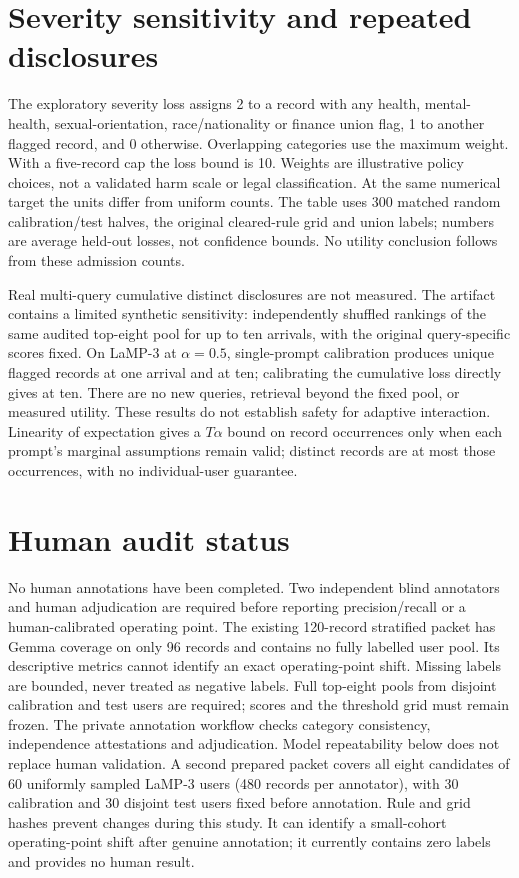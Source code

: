 \documentclass[10pt]{article}
\begin{document}
\section{Severity sensitivity and repeated disclosures}
The exploratory severity loss assigns 2 to a record with any health,
mental-health, sexual-orientation, race/nationality or finance union flag,
1 to another flagged record, and 0 otherwise. Overlapping categories use
the maximum weight. With a five-record cap the loss bound is 10.
Weights are illustrative policy choices, not a validated harm scale or
legal classification. At the same numerical target the units differ from
uniform counts. The table uses 300 matched random calibration/test halves,
the original cleared-rule grid and union labels; numbers are average
held-out losses, not confidence bounds. No utility conclusion follows
from these admission counts.


Real multi-query cumulative distinct disclosures are not measured. The
artifact contains a limited synthetic sensitivity: independently shuffled
rankings of the same audited top-eight pool for up to ten arrivals, with
the original query-specific scores fixed. On LaMP-3 at $\alpha=0.5$,
single-prompt calibration produces \CumulativeSingleOne{} unique flagged records at one
arrival and \CumulativeSingleTen{} at ten; calibrating the cumulative loss directly gives
\CumulativeCalibratedTen{} at ten. There are no new queries, retrieval beyond the fixed pool,
or measured utility. These results do not establish safety for adaptive
interaction. Linearity of expectation gives a $T\alpha$ bound on record
occurrences only when each prompt's marginal assumptions remain valid;
distinct records are at most those occurrences, with no individual-user guarantee.

\section{Human audit status}
No human annotations have been completed. Two independent blind annotators
and human adjudication are required before reporting precision/recall or a
human-calibrated operating point. The existing 120-record stratified packet
has Gemma coverage on only 96 records and contains no fully labelled user
pool. Its descriptive metrics cannot identify an exact operating-point
shift. Missing labels are bounded, never treated as negative labels.
Full top-eight pools from disjoint calibration and test users are required;
scores and the threshold grid must remain frozen. The private annotation
workflow checks category consistency, independence attestations and
adjudication. Model repeatability below does not replace human validation.
A second prepared packet covers all eight candidates of 60 uniformly sampled
LaMP-3 users (480 records per annotator), with 30 calibration and 30 disjoint
test users fixed before annotation. Rule and grid hashes prevent changes
during this study. It can identify a small-cohort operating-point shift after
genuine annotation; it currently contains zero labels and provides no human result.
\end{document}
